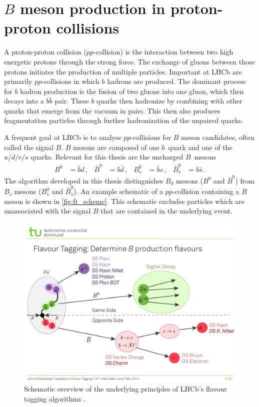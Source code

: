 \section{$B$ meson production in proton-proton collisions}
\label{sec:B_mesons}

A proton-proton collision ($pp$-collision) is the interaction between two high energetic protons through the strong force.
The exchange of gluons between those protons initiates the production of multiple particles. 
Important at LHCb are primarily $pp$-collisions in which $b$ hadrons are produced.
The dominant process for $b$ hadron production is the fusion of two gluons into one gluon, which then decays into a $b\bar{b}$ pair.
These $b$ quarks then hadronize by combining with other quarks that emerge from the vacuum in pairs.
This then also produces fragmentation particles through further hadronization of the unpaired quarks.

A frequent goal at LHCb is to analyse $pp$-collisions for $B$ meson candidates, often called the signal $B$.
$B$ mesons are composed of one $b$~quark and one of the $u/d/c/s$ quarks.
Relevant for this thesis are the uncharged $B$~mesons
\begin{align*}
    B^0 &= \bar{b}d \, , & \bar{B}^0 &= b\bar{d} \, , & B_s^0 &= \bar{b}s \, , & \bar{B}_s^0 &= b\bar{s} \, .
\end{align*}
The algorithm developed in this thesis distinguishes $B_d$ mesons ($B^0$ and $\bar{B}^0$) from $B_s$ mesons ($B_s^0$ and $\bar{B}_s^0$).
An example schematic of a $pp$-collision containing a $B$ meson is shown in \autoref{fig:ft_scheme}. 
This schematic excludes particles which are unassociated with the signal $B$ that are contained in the underlying event.

\begin{figure}
    \centering
    \includegraphics[width=\textwidth]{images/FlavourTaggingScheme.pdf}
    \caption{Schematic overview of the underlying principles of LHCb's flavour tagging algorithms \cite{ft_scheme}.}
    \label{fig:ft_scheme}
\end{figure}


